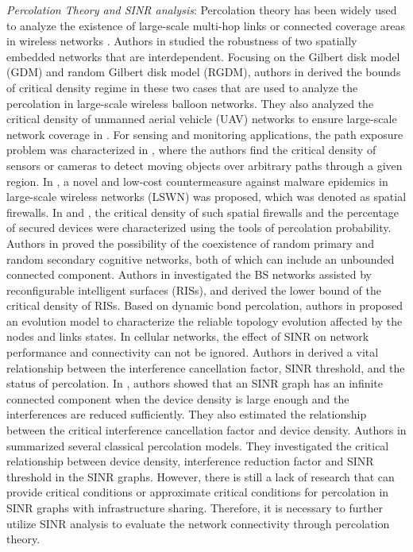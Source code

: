 \indent \textit{Percolation Theory and SINR analysis}: Percolation theory has been widely used to analyze the existence of large-scale multi-hop links or connected coverage areas in wireless networks \cite{haenggi2012stochastic, elsawy2023tutorial}. Authors in \cite{zhang2018robustness} studied the robustness of two spatially embedded networks that are interdependent. Focusing on the Gilbert disk model (GDM) and random Gilbert disk model (RGDM), authors in \cite{anjum2019percolation} derived the bounds of critical density regime in these two cases that are used to analyze the percolation in large-scale wireless balloon networks. They also analyzed the critical density of unmanned aerial vehicle (UAV) networks to ensure large-scale network coverage in \cite{9049663}. For sensing and monitoring applications, the path exposure problem was characterized in \cite{8794718,liu2012optimal}, where the authors find the critical density of sensors or cameras to detect moving objects over arbitrary paths through a given region. In \cite{9214384}, a novel and low-cost countermeasure against malware epidemics in large-scale wireless networks (LSWN) was proposed, which was denoted as spatial firewalls. In \cite{9214384} and \cite{9240972}, the critical density of such spatial firewalls and the percentage of secured devices were characterized using the tools of percolation probability. Authors in \cite{yemini2019simultaneous} proved the possibility of the coexistence of random primary and random secondary cognitive networks, both of which can include an unbounded connected component. Authors in \cite{wu2023connectivity} investigated the BS networks assisted by reconfigurable intelligent surfaces (RISs), and derived the lower bound of the critical density of RISs. Based on dynamic bond percolation, authors in \cite{han2024dynamic} proposed an evolution model to characterize the reliable topology evolution affected by the nodes and links states. In cellular networks, the effect of SINR on network performance and connectivity can not be ignored. Authors in \cite{jahnel2022sinr} derived a vital relationship between the interference cancellation factor, SINR threshold, and the status of percolation. In \cite{tobias2020signal}, authors showed that an SINR graph has an infinite connected component when the device density is large enough and the interferences are reduced sufficiently. They also estimated the relationship between the critical interference cancellation factor and device density. Authors in \cite{elsawy2023tutorial} summarized several classical percolation models. They investigated the critical relationship between device density, interference reduction factor and SINR threshold in the SINR graphs. However, there is still a lack of research that can provide critical conditions or approximate critical conditions for percolation in SINR graphs with infrastructure sharing. Therefore, it is necessary to further utilize SINR analysis to evaluate the network connectivity through percolation theory.